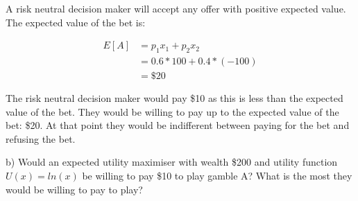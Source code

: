 \documentclass[
  letterpaper,
  DIV=11,
  numbers=noendperiod]{scrreprt}
\begin{document}
\begin{tcolorbox}[enhanced jigsaw, title=\textcolor{quarto-callout-tip-color}{\faLightbulb}\hspace{0.5em}{Answer}, toprule=.15mm, colback=white, breakable, titlerule=0mm, colframe=quarto-callout-tip-color-frame, coltitle=black, opacityback=0, rightrule=.15mm, colbacktitle=quarto-callout-tip-color!10!white, bottomtitle=1mm, opacitybacktitle=0.6, arc=.35mm, bottomrule=.15mm, toptitle=1mm, leftrule=.75mm, left=2mm]

A risk neutral decision maker will accept any offer with positive
expected value. The expected value of the bet is:

\begin{align*}
E[A]&=p_1x_1+p_2x_2 \\
&=0.6*100+0.4*(-100) \\
&=\$20
\end{align*}

The risk neutral decision maker would pay \$10 as this is less than the
expected value of the bet. They would be willing to pay up to the
expected value of the bet: \$20. At that point they would be indifferent
between paying for the bet and refusing the bet.

\end{tcolorbox}

b) Would an expected utility maximiser with wealth \$200 and utility
function \(U(x)=ln(x)\) be willing to pay \$10 to play gamble A? What is
the most they would be willing to pay to play?
\end{document}
